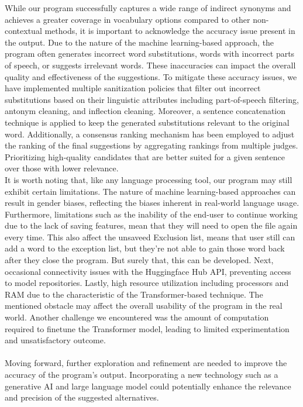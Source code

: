 \documentclass[12pt,oneside,openright,a4paper]{cpe-english-project}
\begin{document}
While our program successfully captures a wide range of indirect synonyms and achieves a greater coverage in vocabulary options compared to other non-contextual methods, it is important to acknowledge the accuracy issue present in the output. Due to the nature of the machine learning-based approach, the program often generates incorrect word substitutions, words with incorrect parts of speech, or suggests irrelevant words. These inaccuracies can impact the overall quality and effectiveness of the suggestions. To mitigate these accuracy issues, we have implemented multiple sanitization policies that filter out incorrect substitutions based on their linguistic attributes including part-of-speech filtering, antonym cleaning, and inflection cleaning. Moreover, a sentence concatenation technique is applied to keep the generated substitutions relevant to the original word. Additionally, a consensus ranking mechanism has been employed to adjust the ranking of the final suggestions by aggregating rankings from multiple judges. Prioritizing high-quality candidates that are better suited for a given sentence over those with lower relevance. \\

It is worth noting that, like any language processing tool, our program may still exhibit certain limitations. The nature of machine learning-based approaches can result in gender biases, reflecting the biases inherent in real-world language usage. Furthermore, limitations such as the inability of the end-user to continue working due to the lack of saving features, mean that they will need to open the file again every time. This also affect the unsaveed Exclusion list, means that user still can add a word to the exception list, but they're not able to gain those word back after they close the program. But surely that, this can be developed. Next, occasional connectivity issues with the Huggingface Hub API, preventing access to model repositories. Lastly, high resource utilization including processors and RAM due to the characteristic of the Transformer-based technique. The mentioned obstacle may affect the overall usability of the program in the real world.
Another challenge we encountered was the amount of computation required to finetune the Transformer model, leading to limited experimentation and unsatisfactory outcome.\\\\

Moving forward, further exploration and refinement are needed to improve the accuracy of the program's output. Incorporating a new technology such as a generative AI and large language model could potentially enhance the relevance and precision of the suggested alternatives.\\
\end{document}
